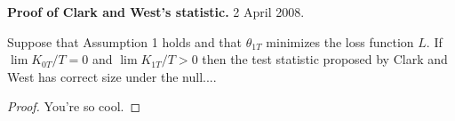 

\textbf{Proof of Clark and West's statistic.} 2 April 2008.


\begin{lem}
Suppose that Assumption 1 holds and that $\theta_{1T}$ minimizes the loss
function $L$.  If $\lim K_{0T} / T = 0$ and $\lim K_{1T} / T > 0$
then the test statistic proposed by Clark and West has correct size
under the null....
\end{lem}

\begin{proof}
You're so cool.
\end{proof}


